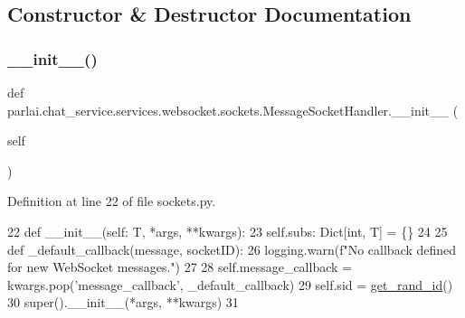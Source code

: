 \subsection{Constructor \& Destructor Documentation}
\mbox{\label{classparlai_1_1chat__service_1_1services_1_1websocket_1_1sockets_1_1MessageSocketHandler_afae9fa75381c0bdd28fe19765bba5ede}} 
\subsubsection{\texorpdfstring{\+\_\+\+\_\+init\+\_\+\+\_\+()}{\_\_init\_\_()}}
{\footnotesize\ttfamily def parlai.\+chat\+\_\+service.\+services.\+websocket.\+sockets.\+Message\+Socket\+Handler.\+\_\+\+\_\+init\+\_\+\+\_\+ (\begin{DoxyParamCaption}\item[{}]{self }\end{DoxyParamCaption})}



Definition at line 22 of file sockets.\+py.


\begin{DoxyCode}
22     \textcolor{keyword}{def }\_\_init\_\_(self: T, *args, **kwargs):
23         self.subs: Dict[int, T] = \{\}
24 
25         \textcolor{keyword}{def }\_default\_callback(message, socketID):
26             logging.warn(f\textcolor{stringliteral}{"No callback defined for new WebSocket messages."})
27 
28         self.message\_callback = kwargs.pop(\textcolor{stringliteral}{'message\_callback'}, \_default\_callback)
29         self.sid = \hyperlink{namespaceparlai_1_1chat__service_1_1services_1_1websocket_1_1sockets_a474be2aef9361e19eacf308fbce1e802}{get\_rand\_id}()
30         super().\_\_init\_\_(*args, **kwargs)
31 
\end{DoxyCode}


